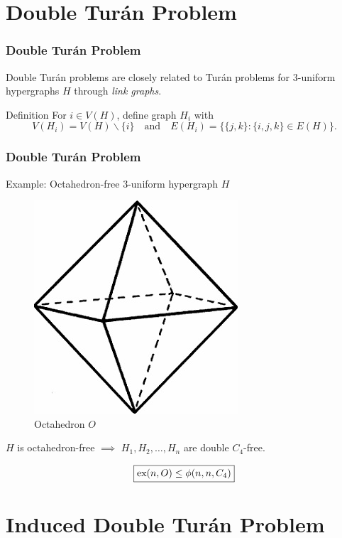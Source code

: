 \documentclass{beamer}
\newcommand*{\ex}{\textnormal{ex}}
\begin{document}
\section{Double Turán Problem}

\begin{frame}
  \frametitle{Double Turán Problem}

  Double Turán problems are closely related to Turán problems for $3$-uniform hypergraphs $H$ through \textit{link graphs}.

  \pause

  \vspace{0.3cm}

  \begin{block}{Definition}
    For $i \in V(H)$, define graph $H_i$ with
    \[
      V(H_i) = V(H) \backslash \{i\} \quad \text{and} \quad E(H_i) = \{\{j, k\} : \{i, j, k\} \in E(H)\}.
    \]
  \end{block}
\end{frame}

\begin{frame}
  \frametitle{Double Turán Problem}

  Example: Octahedron-free 3-uniform hypergraph $H$

  \pause

  \begin{figure}
    \includegraphics[width=0.15\linewidth]{oct}
    \caption{Octahedron $O$}
    \centering
  \end{figure}

  \pause

  \begin{center}
    $H$ is octahedron-free $\implies$ $H_1, H_2, \ldots, H_n$ are double $C_4$-free.
  \end{center}

  \pause

  \[
    \boxed{\ex(n, O) \leq \phi(n, n, C_4)}
  \]
\end{frame}

\section{Induced Double Turán Problem}
\end{document}
